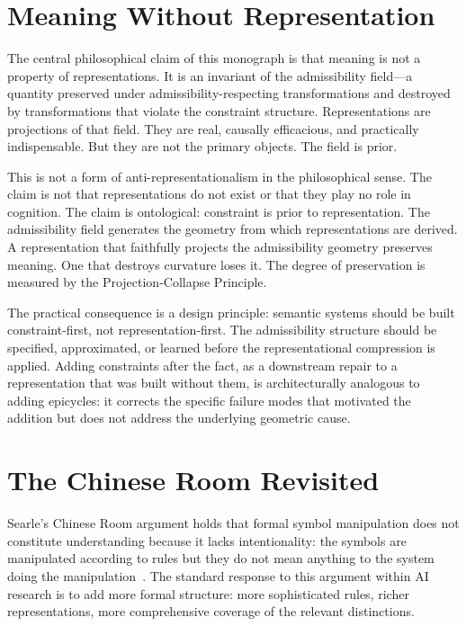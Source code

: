 \documentclass[12pt, oneside]{book}
\theoremstyle{plain-flyxion}
\theoremstyle{definition-flyxion}
\begin{document}
\section{Meaning Without Representation}

The central philosophical claim of this monograph is that meaning is not a property of
representations. It is an invariant of the admissibility field---a quantity preserved
under admissibility-respecting transformations and destroyed by transformations that
violate the constraint structure. Representations are projections of that field. They are
real, causally efficacious, and practically indispensable. But they are not the primary
objects. The field is prior.

This is not a form of anti-representationalism in the philosophical sense. The claim is
not that representations do not exist or that they play no role in cognition. The claim
is ontological: constraint is prior to representation. The admissibility field generates
the geometry from which representations are derived. A representation that faithfully
projects the admissibility geometry preserves meaning. One that destroys curvature loses
it. The degree of preservation is measured by the Projection-Collapse Principle.

The practical consequence is a design principle: semantic systems should be built
constraint-first, not representation-first. The admissibility structure should be
specified, approximated, or learned before the representational compression is applied.
Adding constraints after the fact, as a downstream repair to a representation that was
built without them, is architecturally analogous to adding epicycles: it corrects the
specific failure modes that motivated the addition but does not address the underlying
geometric cause.

\section{The Chinese Room Revisited}

Searle's Chinese Room argument holds that formal symbol manipulation does not constitute
understanding because it lacks intentionality: the symbols are manipulated according to
rules but they do not mean anything to the system doing the manipulation~\cite{searle1980}.
The standard response to this argument within AI research is to add more formal structure:
more sophisticated rules, richer representations, more comprehensive coverage of the
relevant distinctions.
\end{document}
